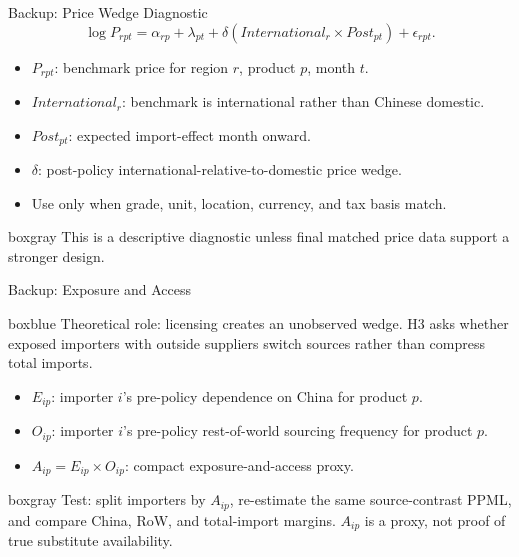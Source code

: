 \documentclass[aspectratio=169,11pt]{beamer}
\newcommand{\tightitem}{\setlength\itemsep{0.25em}}
\newcommand{\plainbox}[2]{%
  \begin{beamercolorbox}[rounded=true,sep=0.48em,wd=\textwidth]{#1}
    #2
  \end{beamercolorbox}
}
\begin{document}
\appendix

\begin{frame}[noframenumbering]{Backup: Price Wedge Diagnostic}
  \[
  \log P_{rpt} =
  \alpha_{rp}+\lambda_{pt}
  + \delta (International_r \times Post_{pt})
  + \epsilon_{rpt}.
  \]

  \vspace{0.05cm}
  \small
  \begin{itemize}
    \tightitem
    \item \(P_{rpt}\): benchmark price for region \(r\), product \(p\), month \(t\).
    \item \(International_r\): benchmark is international rather than Chinese domestic.
    \item \(Post_{pt}\): expected import-effect month onward.
    \item \(\delta\): post-policy international-relative-to-domestic price wedge.
    \item Use only when grade, unit, location, currency, and tax basis match.
  \end{itemize}

  \vspace{0.08cm}
  \plainbox{boxgray}{%
    \small This is a descriptive diagnostic unless final matched price data support a stronger design.
  }
\end{frame}

\begin{frame}[noframenumbering]{Backup: Exposure and Access}
  \small
  \plainbox{boxblue}{%
    \small Theoretical role: licensing creates an unobserved wedge. H3 asks whether exposed importers with outside suppliers switch sources rather than compress total imports.
  }

  \vspace{0.14cm}
  \begin{itemize}
    \tightitem
    \item \(E_{ip}\): importer \(i\)'s pre-policy dependence on China for product \(p\).
    \item \(O_{ip}\): importer \(i\)'s pre-policy rest-of-world sourcing frequency for product \(p\).
    \item \(A_{ip}=E_{ip}\times O_{ip}\): compact exposure-and-access proxy.
  \end{itemize}

  \vspace{0.18cm}
  \plainbox{boxgray}{%
    \small Test: split importers by \(A_{ip}\), re-estimate the same source-contrast PPML, and compare China, RoW, and total-import margins. \(A_{ip}\) is a proxy, not proof of true substitute availability.
  }
\end{frame}
\end{document}
